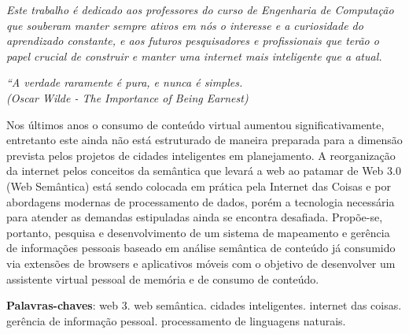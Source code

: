 \documentclass[
	12pt,				%
	openright,			%
	twoside,			%
	a4paper,			%
	english,			%
	french,				%
	spanish,			%
	brazil				%
	]{abntex2}
\begin{document}
\begin{dedicatoria}
   \vspace*{\fill}
   \centering
   \noindent
   \textit{ Este trabalho é dedicado aos professores do curso de Engenharia de Computação que souberam manter sempre ativos em nós o interesse e a curiosidade do aprendizado constante, e aos futuros pesquisadores e profissionais que terão o papel crucial de construir e manter uma internet mais inteligente que a atual. } \vspace*{\fill}
\end{dedicatoria}

\begin{epigrafe}
    \vspace*{\fill}
	\begin{flushright}
		\textit{``A verdade raramente é pura, e nunca é simples. \\
		(Oscar Wilde - The Importance of Being Earnest)}
	\end{flushright}
\end{epigrafe}


\setlength{\absparsep}{18pt} %
\begin{resumo}
 Nos últimos anos o consumo de conteúdo virtual aumentou significativamente, entretanto este ainda não está estruturado de maneira preparada para a dimensão prevista pelos projetos de cidades inteligentes em planejamento. A reorganização da internet pelos conceitos da semântica que levará a web ao patamar de Web 3.0 (Web Semântica) está sendo colocada em prática pela Internet das Coisas e por abordagens modernas de processamento de dados, porém a tecnologia necessária para atender as demandas estipuladas ainda se encontra desafiada. Propõe-se, portanto, pesquisa e desenvolvimento de um sistema de mapeamento e gerência de informações pessoais baseado em análise semântica de conteúdo já consumido via extensões de browsers e aplicativos móveis com o objetivo de desenvolver um assistente virtual pessoal de memória e de consumo de conteúdo.

 \textbf{Palavras-chaves}: web 3. web semântica. cidades inteligentes. internet das coisas. gerência de informação pessoal. processamento de linguagens naturais.
\end{resumo}
\end{document}
